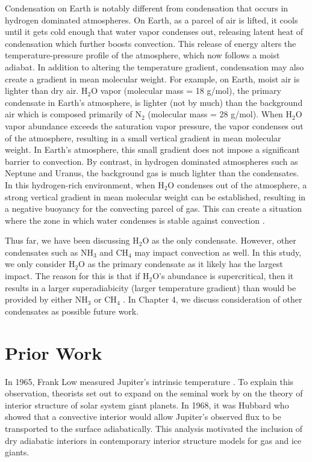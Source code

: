 \documentclass[11pt]{ucscthesisbs}
\begin{document}
Condensation on Earth is notably different from condensation that occurs in hydrogen dominated atmospheres. On Earth, as a parcel of air is lifted, it cools until it gets cold enough that water vapor condenses out, releasing latent heat of condensation which further boosts convection. This release of energy alters the temperature-pressure profile of the atmosphere, which now follows a moist adiabat.  In addition to altering the temperature gradient, condensation may also create a gradient in mean molecular weight. For example, on Earth, moist air is lighter than dry air. H$_{2}$O vapor (molecular mass = 18 g/mol), the primary condensate in Earth's atmosphere, is lighter (not by much) than the background air which is composed primarily of N$_{2}$ (molecular mass = 28 g/mol). When H$_{2}$O vapor abundance exceeds the saturation vapor pressure, the vapor condenses out of the atmosphere, resulting in a small vertical gradient in mean molecular weight. In Earth's atmosphere, this small gradient does not impose a significant barrier to convection. By contrast, in hydrogen dominated atmospheres such as Neptune and Uranus, the background gas is much lighter than the condensates. In this hydrogen-rich environment, when H$_{2}$O condenses out of the atmosphere, a strong vertical gradient in mean molecular weight can be established, resulting in a negative buoyancy for the convecting parcel of gas. This can create a situation where the zone in which water condenses is stable against convection \citep{guillot_1995,friedson_2017,leconte_2017}. 

Thus far, we have been discussing H$_{2}$O as the only condensate. However, other condensates such as NH$_{3}$ and CH$_{4}$ may impact convection as well. In this study, we only consider H$_{2}$O as the primary condensate as it likely has the largest impact. The reason for this is that if H$_{2}$O's abundance is supercritical, then it results in a larger superadiabicity (larger temperature gradient) than would be provided by either NH$_{3}$ or CH$_{4}$ \citep{guillot_1995}. In Chapter 4, we discuss consideration of other condensates as possible future work.




\section{Prior Work}
In 1965, Frank Low measured Jupiter's intrinsic temperature \citep{low_1966}. To explain this observation, theorists \citep{hubbard_1968, smoluchowski_1967,hubbard_1977, hubbard_1977_2, podolak_1991} set out to expand on the seminal work by \citep{demarcus_1958} on the theory of interior structure of solar system giant planets. In 1968, it was Hubbard who showed that a convective interior would allow Jupiter's observed flux to be transported to the surface adiabatically. This analysis motivated the inclusion of dry adiabatic interiors in contemporary interior structure models for gas and ice giants.
\end{document}
